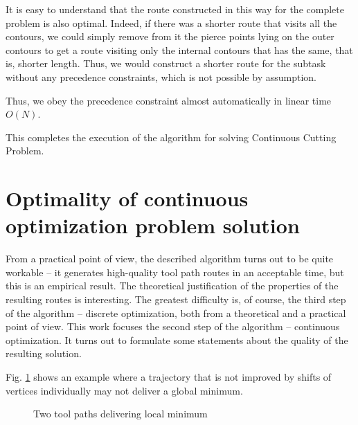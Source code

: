 \documentclass[]{llncs}
\begin{document}
It is easy to understand
that the route constructed in this way
for the complete problem
is also optimal.
Indeed,
if there was a shorter route
that visits all the contours,
we could simply remove from it
the pierce points
lying on the outer contours to get a route
visiting only the internal contours
that has the same, that is, shorter length.
Thus, we would construct a shorter route
for the subtask without any precedence constraints,
which is not possible by assumption.

Thus,
we obey the precedence constraint
almost automatically in linear time
$O(N)$.

This completes the execution of the algorithm
for solving Continuous Cutting Problem.

\section{Optimality of continuous optimization problem solution}

From a practical point of view,
the described algorithm turns out to be quite workable --
it generates high-quality tool path routes in an acceptable time,
but this is an empirical result.
The theoretical justification of the properties
of the resulting routes is interesting.
The greatest difficulty is, of course,
the third step of the algorithm --
discrete optimization,
both from a theoretical and a
practical point of view.
This work focuses the second step of the algorithm --
continuous optimization.
It turns out to formulate some statements
about the quality of the resulting solution.

\begin{remark}
Fig. \ref{counter-example} shows an example where a trajectory
that is not improved by shifts of vertices individually
may not deliver a global minimum.

\begin{figure}
  \begin{center}
  \end{center}
  \caption{Two tool paths delivering local minimum}
  \label{counter-example}
  \end{figure}
\end{remark}
\end{document}
